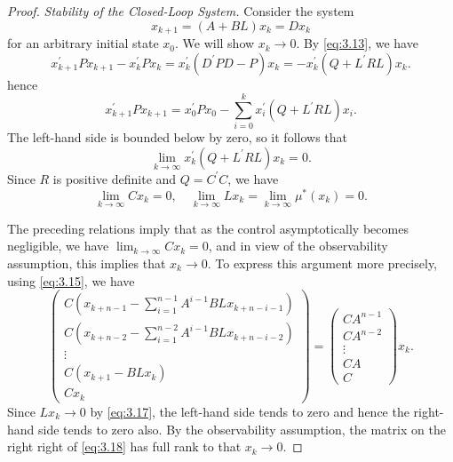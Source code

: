 \begin{proof}
\textit{Stability of the Closed-Loop System.}
    Consider the system \begin{equation}\label{eq:3.15}
        x_{k + 1} =(A + BL)x_k = D x_k
    \end{equation}
    for an arbitrary initial state $x_0$. We will show $x_k\rightarrow 0$. 
    By \cref{eq:3.13}, we have \[x_{k + 1}^\prime P x_{k + 1} - x_k^\prime P x_k = x_k^\prime (D^\prime P D - P)x_k =- x_k^\prime (Q + L^\prime R L)x_k .\]
    hence
    \begin{equation}\label{eq:3.16}
        x_{k + 1}^\prime P x_{k + 1} = x_0^{\prime} P x_0 - \sum_{i=0}^{k }x_i^{\prime} (Q + L^\prime R L)x_i. 
    \end{equation}
    The left-hand side is bounded below by zero, so it follows that 
    \[\lim_{k\rightarrow\infty} x_k^\prime (Q + L^\prime R L)x_k = 0.\]
Since $R$ is positive definite and $Q=C^\prime C$, we have 
\begin{equation}\label{eq:3.17}
    \lim_{k\rightarrow\infty} C x_k = 0,\quad \lim_{k\rightarrow\infty} Lx_k = \lim_{k\rightarrow\infty} \mu^*(x_k) = 0.
\end{equation}

The preceding relations imply that as the control asymptotically becomes negligible, we have $\lim_{k\rightarrow\infty} C x_k=0$, and in view of the observability assumption, this implies that $x_k\rightarrow 0$. To express this argument more precisely, using \cref{eq:3.15}, we have 
\begin{equation}\label{eq:3.18} \left(\begin{array}{c} C\left(x_{k+n-1}-\sum_{i=1}^{n-1}
A^{i-1} B L x_{k+n-i-1}\right) \\ C\left(x_{k+n-2}-\sum_{i=1}^{n-2} A^{i-1} B L
x_{k+n-i-2}\right) \\ \vdots \\ C\left(x_{k+1}-B L x_k\right) \\ C x_k
\end{array}\right)=\left(\begin{array}{c} C A^{n-1} \\ C A^{n-2} \\ \vdots \\ C
A \\ C \end{array}\right) {x_k}.
\end{equation}
Since $Lx_k\rightarrow 0$ by \cref{eq:3.17}, the left-hand side tends to zero and hence the right-hand side tends to zero also. By the observability assumption, the matrix on the right right of \cref{eq:3.18} has full rank to that $x_k\rightarrow 0$.



\end{proof}
